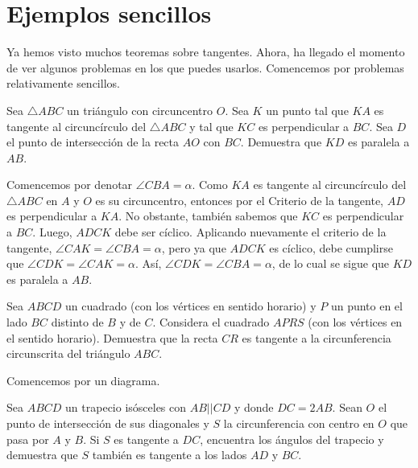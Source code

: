 \documentclass{article}
\begin{document}
\section*{Ejemplos sencillos}

Ya hemos visto muchos teoremas sobre tangentes. Ahora, ha llegado el momento
de ver algunos problemas en los que puedes usarlos. Comencemos por problemas 
relativamente sencillos.

\begin{ejemplo}
    Sea $\triangle ABC$ un triángulo con circuncentro $O$. Sea $K$ un punto
    tal que $KA$ es tangente al circuncírculo del $\triangle ABC$ y tal que
    $KC$ es perpendicular a $BC$. 
    Sea $D$ el punto de intersección de la recta $AO$ con 
    $BC$. Demuestra que $KD$ es paralela a $AB$.
\end{ejemplo}

\begin{solucion}
    Comencemos por denotar $\angle CBA = \alpha$. Como $KA$ es tangente
    al circuncírculo del $\triangle ABC$ en $A$ y $O$ es su circuncentro,
    entonces por el Criterio de la tangente, $AD$ es perpendicular a 
    $KA$. No obstante, también sabemos que $KC$ es perpendicular a $BC$. Luego,
    $ADCK$ debe ser cíclico. Aplicando nuevamente el criterio de la tangente, 
    $\angle CAK = \angle CBA = \alpha$, pero ya que $ADCK$ es cíclico, debe
    cumplirse que $\angle CDK = \angle CAK = \alpha$. Así, 
    $\angle CDK = \angle CBA = \alpha$, de lo cual se sigue que 
    $KD$ es paralela a $AB$.
\end{solucion}

\begin{ejemplo}
    Sea $ABCD$ un cuadrado (con los vértices en sentido horario) y 
    $P$ un punto en el lado $BC$ distinto de $B$ y de $C$. Considera el 
    cuadrado $APRS$ (con los vértices en el sentido horario). Demuestra 
    que la recta $CR$ es tangente a la circunferencia circunscrita del
    triángulo $ABC$.
\end{ejemplo}

\begin{solucion}
    Comencemos por un diagrama.
\end{solucion}

\begin{ejemplo}
    Sea $ABCD$ un trapecio isósceles con $AB || CD$ y donde $DC = 2AB$.
    Sean $O$ el punto de intersección de sus diagonales y $S$ la circunferencia
    con centro en $O$ que pasa por $A$ y $B$. Si $S$ es tangente a $DC$, 
    encuentra los ángulos del trapecio y demuestra que $S$ también es tangente a 
    los lados $AD$ y $BC$.
\end{ejemplo}
\end{document}

